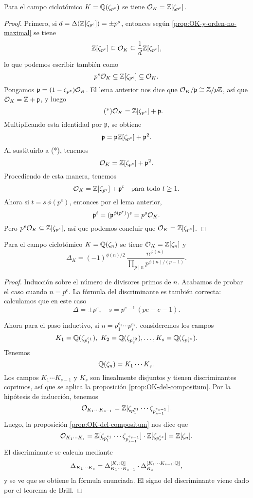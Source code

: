\begin{proposicion}
  Para el campo ciclotómico $K = \mathbb{Q} (\zeta_{p^e})$ se tiene
  $\mathcal{O}_K = \mathbb{Z} [\zeta_{p^e}]$.

  \begin{proof}
    Primero, si $d = \Delta (\mathbb{Z} [\zeta_{p^e}]) = \pm p^s$, entonces según
    \ref{prop:OK-y-orden-no-maximal} se tiene
    $$\mathbb{Z} [\zeta_{p^e}] \subseteq \mathcal{O}_K \subseteq \frac{1}{d} \mathbb{Z} [\zeta_{p^e}],$$
    lo que podemos escribir también como
    $$p^s \mathcal{O}_K \subseteq \mathbb{Z} [\zeta_{p^e}] \subseteq \mathcal{O}_K.$$
    Pongamos $\mathfrak{p} = (1 - \zeta_{p^e})\mathcal{O}_K$. El lema anterior nos dice
    que $\mathcal{O}_K/\mathfrak{p} \cong \mathbb{Z}/p\mathbb{Z}$, así que
    $\mathcal{O}_K = \mathbb{Z} + \mathfrak{p}$, y luego
    \[ \tag{*} \mathcal{O}_K = \mathbb{Z} [\zeta_{p^e}] + \mathfrak{p}. \]
    Multiplicando esta identidad por $\mathfrak{p}$, se obtiene
    $$\mathfrak{p} = \mathfrak{p}\mathbb{Z} [\zeta_{p^e}] + \mathfrak{p}^2.$$
    Al sustituirlo a (*), tenemos
    $$\mathcal{O}_K = \mathbb{Z} [\zeta_{p^e}] + \mathfrak{p}^2.$$
    Procediendo de esta manera, tenemos
    $$\mathcal{O}_K = \mathbb{Z} [\zeta_{p^e}] + \mathfrak{p}^t\quad\text{para todo }t \ge 1.$$
    Ahora si $t = s \, \phi (p^e)$, entonces por el lema anterior,
    $$\mathfrak{p}^t = (\mathfrak{p}^{\phi (p^e)})^s = p^s \mathcal{O}_K.$$
    Pero $p^s \mathcal{O}_K \subseteq \mathbb{Z} [\zeta_{p^e}]$, así que
    podemos concluir que $\mathcal{O}_K = \mathbb{Z} [\zeta_{p^e}]$.
  \end{proof}
\end{proposicion}

\begin{teorema}
  Para el campo ciclotómico $K = \mathbb{Q} (\zeta_n)$ se tiene $\mathcal{O}_K = \mathbb{Z} [\zeta_n]$
  y
  $$\Delta_K = (-1)^{\phi(n)/2}\,\frac{n^{\phi (n)}}{\prod_{p\mid n} p^{\phi (n)/(p-1)}}.$$

  \begin{proof}
    Inducción sobre el número de divisores primos de $n$. Acabamos de probar
    el caso cuando $n = p^e$. La fórmula del discriminante es también correcta:
    calculamos que en este caso
    $$\Delta = \pm p^s, \quad s = p^{e-1}\,(pe - e - 1).$$

    Ahora para el paso inductivo, si $n = p_1^{e_1}\cdots p_s^{e_s}$,
    consideremos los campos
    \[ K_1 = \mathbb{Q} (\zeta_{p_1^{e_1}}), ~
       K_2 = \mathbb{Q} (\zeta_{p_2^{e_2}}), \ldots,
       K_s = \mathbb{Q} (\zeta_{p_s^{e_s}}). \]
    Tenemos
    $$\mathbb{Q} (\zeta_n) = K_1\cdots K_s.$$
    Los campos $K_1\cdots K_{s-1}$ y $K_s$ son linealmente disjuntos y tienen
    discriminantes coprimos, así que se aplica la proposición
    \ref{prop:OK-del-compositum}. Por la hipótesis de inducción, tenemos
    $$\mathcal{O}_{K_1\cdots K_{s-1}} = \mathbb{Z} [\zeta_{p_1^{e_1}}\cdots \zeta_{p_{s-1}^{e_{s-1}}}].$$
    Luego, la proposición \ref{prop:OK-del-compositum} nos dice que
    \[ \mathcal{O}_{K_1\cdots K_s} =
       \mathbb{Z} [\zeta_{p_1^{e_1}}\cdots \zeta_{p_{s-1}^{e_{s-1}}}] \cdot \mathbb{Z} [\zeta_{p_s^{e_s}}] =
       \mathbb{Z} [\zeta_n]. \]
    El discriminante se calcula mediante
    \[ \Delta_{K_1\cdots K_s} =
       \Delta_{K_1\cdots K_{s-1}}^{[K_s : \mathbb{Q}]} \cdot \Delta_{K_s}^{[K_1\cdots K_{s-1}:\mathbb{Q}]}, \]
    y se ve que se obtiene la fórmula enunciada. El signo del discriminante
    viene dado por el teorema de Brill.
  \end{proof}
\end{teorema}


